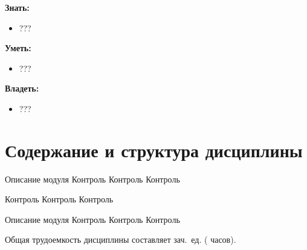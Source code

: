 \textbf{Знать:}
	\begin{itemize}
		\item ???
	\end{itemize}

\textbf{Уметь:}
	\begin{itemize}
		\item ???
	\end{itemize}

\textbf{Владеть:}
	\begin{itemize}
		\item ???
	\end{itemize}

\section{Содержание и структура дисциплины}
	





\myunit
	{Описание модуля}
	{Контроль Контроль Контроль}

\myunit
	{\lipsum[3-4]}
	{Контроль Контроль Контроль}

\myunit
	{Описание модуля}
	{Контроль Контроль Контроль}



	 Общая трудоемкость дисциплины составляет
	 зач.~ед. ( часов).


